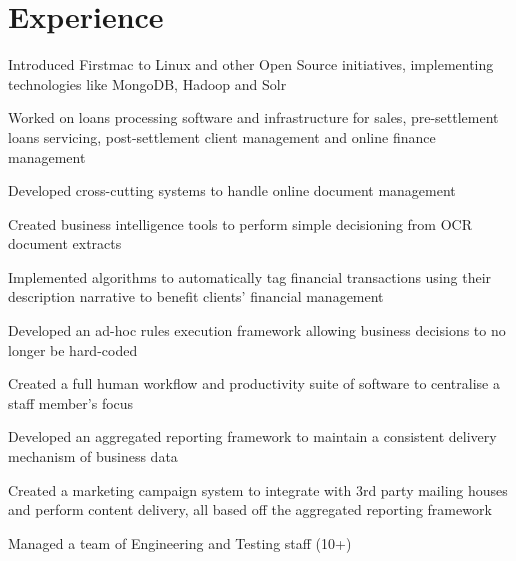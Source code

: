 \documentclass[letterpaper]{deedy-resume} %
\begin{document}
%
\begin{minipage}[t]{0.66\textwidth} %


\section{Experience}


\vspace{\topsep} %
\begin{tightitemize}
\item Introduced Firstmac to Linux and other Open Source initiatives, implementing technologies like MongoDB, Hadoop and Solr
\item Worked on loans processing software and infrastructure for sales, pre-settlement loans servicing, post-settlement client management and online finance management
\item Developed cross-cutting systems to handle online document management 
\item Created business intelligence tools to perform simple decisioning from OCR document extracts
\item Implemented algorithms to automatically tag financial transactions using their description narrative to benefit clients' financial management
\item Developed an ad-hoc rules execution framework allowing business decisions to no longer be hard-coded
\item Created a full human workflow and productivity suite of software to centralise a staff member's focus 
\item Developed an aggregated reporting framework to maintain a consistent delivery mechanism of business data 
\item Created a marketing campaign system to integrate with 3rd party mailing houses and perform content delivery, all based off the aggregated reporting framework
\item Managed a team of Engineering and Testing staff (10+)
\end{tightitemize}


\end{minipage}
\end{document}

